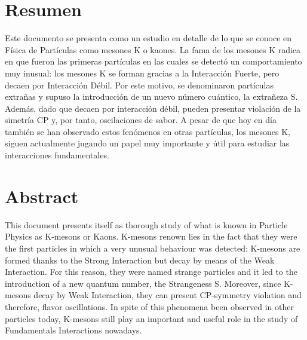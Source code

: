 \chapter*{Resumen}
\label{cap:abstract}

Este documento se presenta como un estudio en detalle de lo que se conoce en Física de Partículas como mesones K o kaones. La fama de los mesones K radica en que fueron las primeras partículas en las cuales se detectó un comportamiento muy inusual: los mesones K se forman gracias a la Interacción Fuerte, pero decaen por Interacción Débil. Por este motivo, se denominaron partículas extrañas y supuso la introducción de un nuevo número cuántico, la extrañeza S. Además, dado que decaen por interacción débil, pueden presentar violación de la simetría CP y, por tanto, oscilaciones de sabor. A pesar de que hoy en día también se han observado estos fenómenos en otras partículas, los mesones K, siguen actualmente jugando un papel muy importante y útil para estudiar las interacciones fundamentales. 
\vspace{2cm}

{\let\clearpage\relax\chapter*{Abstract}}
This document presents itself as thorough study of what is known in Particle Physics as K-mesons or Kaons. K-mesons renown lies in the fact that they were the first particles in which a very unusual behaviour was detected: K-mesons are formed thanks to the Strong Interaction but decay by means of the Weak Interaction. For this reason, they were named strange particles and it led to the introduction of a new quantum number, the Strangeness S. Moreover, since K-mesons decay by Weak Interaction, they can present CP-symmetry violation and therefore, flavor oscillations. In spite of this phenomena been observed  in other particles today, K-mesons still play an important and useful role in the study of Fundamentals Interactions nowadays.